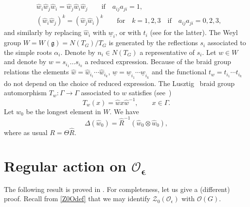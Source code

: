 \documentclass[10pt,a4paper]{amsart}
\numberwithin{equation}{section}
\theoremstyle{definition}
\newcommand{\e}{\epsilon}
\newcommand{\Oo}{{\mathcal O}}
\newcommand{\ra}{\rightarrow}
\begin{document}
\begin{align*}
&\hat{w}_i\hat{w}_j\hat{w}_i = \hat{w}_j\hat{w}_i\hat{w}_j\qquad \text{if}\quad a_{ij}a_{ji}=1,\\
& (\hat{w}_i\hat{w}_j)^k = (\hat{w}_j\hat{w}_i)^k \qquad \text{for}\quad k=1,2,3 \quad \text{if}\quad a_{ij}a_{ji}=0,2,3,
\end{align*}
and similarly by replacing $\hat{w}_i$ with $\underline{w}_i$, or with $t_i$ (see \cite{Soi} for the latter). The Weyl group $W=W(\mathfrak{g}) = N(T_G)/T_G$ is generated by the reflections $s_i$ associated to the simple roots $\alpha_i$. Denote by $n_i\in N(T_G)$ a representative of $s_i$. Let $w\in W$ and denote by $w=s_{i_1}\dots s_{i_k}$ a reduced expression. Because of the braid group relations the elements $\hat{w}=\hat{w}_{i_1}\cdots \hat{w}_{i_k}$, $\underline{w}=\underline{w}_{i_1}\cdots \underline{w}_{i_k}$ and the functional $t_w=t_{i_1}\cdots t_{i_k}$
do not depend on the choice of reduced expression. The Lusztig~\cite{Lusztig2} braid group automorphism $T_w \colon \Gamma \ra \Gamma$ associated to $w$ satisfies (see~\cite{DC-L})
\[T_w(x)=\hat{w}x\hat{w}^{-1}, \qquad x \in \Gamma.\]
Let $w_0$ be the longest element in $W$. We have
\begin{equation}\label{Deltaw}
\Delta(\hat{w}_0)=\hat{R}^{-1}(\hat{w}_0\otimes\hat{w}_0),
\end{equation}
where as usual $R={\Theta}{\hat R}$.

\section[Regular action on O\_e]{Regular action on $\boldsymbol{\Oo_\e}$}\label{actO}

The following result is proved in \cite[Section 1.10]{DC-L}. For completeness, let us give a (different) proof. Recall from \eqref{Z0Odef} that we may identify $\mathcal{Z}_0(\Oo_\e)$ with $\Oo(G)$.
\end{document}
